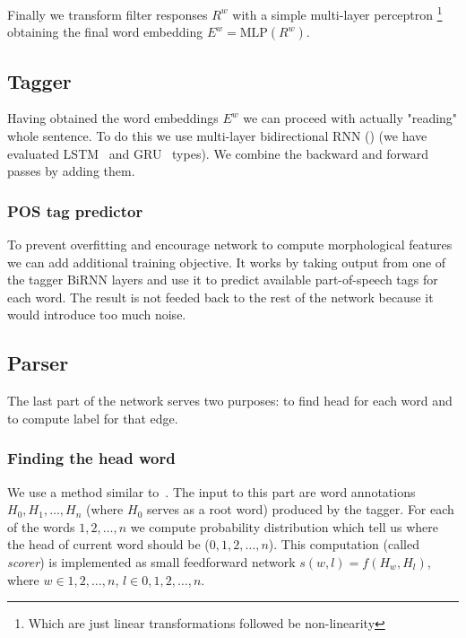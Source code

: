 Finally we transform filter responses $R^w$ with a simple multi-layer perceptron
\footnote{Which are just linear transformations followed be non-linearity}
obtaining the final word embedding $E^w = \text{MLP}(R^w)$.

\subsection{Tagger}
\begin{sloppypar}
Having obtained the word embeddings $E^w$ we can proceed with actually "reading"
whole sentence. To do this we use multi-layer bidirectional RNN (\cite{schuster_bidirectional_1997})
(we have evaluated LSTM~\cite{RNN_LSTM} and GRU~\cite{RNN_GRU} types). We combine
the backward and forward passes by adding them.
\end{sloppypar}

\subsubsection{POS tag predictor}
To prevent overfitting and encourage network to compute morphological features
we can add additional training objective. It works by taking output from one of
the tagger BiRNN layers and use it to predict available part-of-speech tags for
each word. The result is not feeded back to the rest of the network because it would introduce too much noise.

\subsection{Parser}
The last part of the network serves two purposes: to find head for each word and
to compute label for that edge.

\subsubsection{Finding the head word}
We use a method similar to~\cite{vinyals_pointer_2015}.
The input to this part are word annotations $H_0, H_1, \dots, H_n$ (where $H_0$
serves as a root word) produced by the tagger. For each of the words $1,2,\dots,n$
we compute probability distribution which tell us where the head of current
word should be ($0,1,2,\dots,n$). This computation (called \emph{scorer}) is implemented
as small feedforward network $s(w,l) = f(H_w, H_l)$, where $w \in {1,2,\dots,n}$,
$l \in {0,1,2,\dots,n}$.

